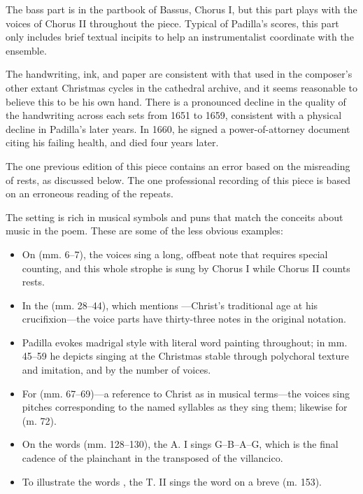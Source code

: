 The bass part is in the partbook of Bassus, Chorus I, but this part plays with 
the voices of Chorus II throughout the piece.
Typical of Padilla's scores, this part only includes brief textual
incipits to help an instrumentalist coordinate with the ensemble.

The handwriting, ink, and paper are consistent with that used in the composer's
other extant Christmas cycles in the cathedral archive, and it seems reasonable
to believe this to be his own hand.
There is a pronounced decline in the quality of the handwriting across each sets
from 1651 to 1659, consistent with a physical decline in Padilla's later
years.
In 1660, he signed a power-of-attorney document citing his failing 
health, and died four years later.%
    \Autocite{Mauleon:PadillaCivil}

The one previous edition of this piece contains an error based on the 
misreading of rests, as discussed below.%
    \Autocite{Padilla:Tello}
The one professional recording of this piece is based on an erroneous reading of
the repeats.%
  \autocite{Padilla:HabanaCD}

The setting is rich in musical symbols and puns that match the conceits about
music in the poem.
These are some of the less obvious examples:
\begin{itemize}
    \item On  (mm. 6--7), the voices sing a long, offbeat note that
        requires special counting, and this whole strophe is sung by Chorus I
        while Chorus II counts rests.
    \item In the  (mm. 28--44), which mentions ---Christ's traditional age at his crucifixion---the voice
        parts have thirty-three notes in the original notation.
    \item Padilla evokes madrigal style with literal word painting throughout; 
        in mm. 45--59 he depicts singing at the Christmas stable  through polychoral texture and imitation, and
         by the number of voices.
    \item For  (mm. 67--69)---a
        reference to Christ as  in musical
        terms---the voices sing pitches corresponding to the named syllables as
        they sing them; likewise for  (m. 72).
    \item On the words  (mm. 128--130), the A. I sings
        G--B\fl--A--G, which is the final cadence of the plainchant  in the transposed  of the villancico.
    \item To illustrate the words , the
        T. II sings the word  on a breve (m. 153).
\end{itemize}

